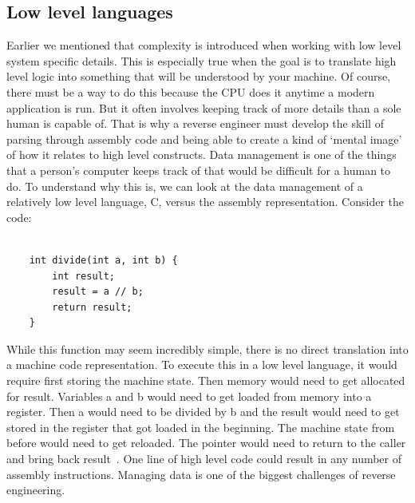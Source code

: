 \subsection{Low level languages}
Earlier we mentioned that complexity is introduced when working with low level system specific details. 
This is especially true when the goal is to translate high level logic into something that will be understood by your machine. 
Of course, there must be a way to do this because the CPU does it anytime a modern application is run. 
But it often involves keeping track of more details than a sole human is capable of. 
That is why a reverse engineer must develop the skill of parsing through assembly code and being able to create a kind of ‘mental image’ of how it relates to high level constructs.
Data management is one of the things that a person’s computer keeps track of that would be difficult for a human to do.
To understand why this is, we can look at the data management of a relatively low level language, C, versus the assembly representation. 
Consider the code: 
\begin{lstlisting}
	
	int divide(int a, int b) {
		int result;
		result = a // b;
		return result;
	}
\end{lstlisting}
While this function may seem incredibly simple, there is no direct translation into a machine code representation. 
To execute this in a low level language, it would require first storing the machine state. 
Then memory would need to get allocated for result. Variables a and b would need to get loaded from memory into a register. 
Then a would need to be divided by b and the result would need to get stored in the register that got loaded in the beginning. 
The machine state from before would need to get reloaded. The pointer would need to return to the caller and bring back result~\cite{Reversing}.
One line of high level code could result in any number of assembly instructions.
Managing data is one of the biggest challenges of reverse engineering.


